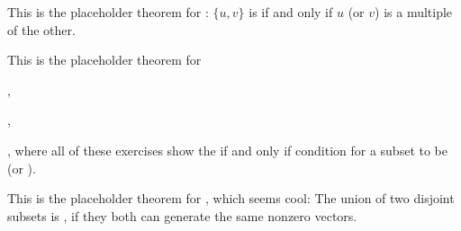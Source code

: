 \begin{additional theorem} \label{athm 1.16}
This is the placeholder theorem for :
\(\{ u, v \}\) is \LDP{} if and only if \(u\) (or \(v\)) is a multiple of the other.
\end{additional theorem}

\begin{additional theorem} \label{athm 1.17}
This is the placeholder theorem for

 ,

 ,

 ,
where all of these exercises show the if and only if condition for a subset to be \LDP{}(or \LID{}).
\end{additional theorem}

\begin{additional theorem} \label{athm 1.18}
This is the placeholder theorem for , which seems cool: The union of two disjoint \LID{} subsets is \LDP{}, if they both can generate the same nonzero vectors.
\end{additional theorem}